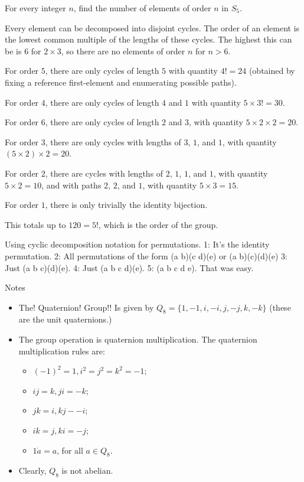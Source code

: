 \documentclass[1    0pt, answers]{exam} \renewcommand{\baselinestretch}{1.05}
\theoremstyle{plain}
\theoremstyle{definition}
\begin{document}
\begin{questions}
\question For every integer $n$, find the number of elements of order $n$ in $S_5$.

\begin{solution}
Every element can be decomposed into disjoint cycles.
The order of an element is the lowest common multiple of the lengths of these cycles.
The highest this can be is $6$ for $2 \times 3$, so there are no elements of order $n$ for $n > 6$.

For order $5$, there are only cycles of length $5$
with quantity $4! = 24$
(obtained by fixing a reference first-element and enumerating possible paths).

For order $4$, there are only cycles of length $4$ and $1$
with quantity $5 \times 3! = 30$.

For order $6$, there are only cycles of length $2$ and $3$,
with quantity $5 \times 2 \times 2 = 20$.

For order $3$, there are only cycles with lengths of $3$, $1$, and $1$,
with quantity $(5 \times 2) \times 2 = 20$.

For order $2$, there are cycles with lengths of $2$, $1$, $1$, and $1$,
with quantity $5 \times 2 = 10$,
and with paths $2$, $2$, and $1$,
with quantity $5 \times 3 = 15$.

For order $1$, there is only trivially the identity bijection.

This totals up to $120 = 5!$, which is the order of the group.
\end{solution}

\begin{solution}
Using cyclic decomposition notation for permutations.
1: It's the identity permutation.
2: All permutations of the form (a b)(c d)(e) or (a b)(c)(d)(e)
3: Just (a b c)(d)(e).
4: Just (a b c d)(e).
5: (a b c d e).
That was easy.
\end{solution}

Notes
\begin{itemize}
\item The! Quaternion! Group!! Is given by $Q_8 = \{ 1, -1, i, -i, j, -j, k, -k \}$ (these are the unit quaternions.)
\item The group operation is quaternion multiplication. The quaternion multiplication rules are:
\begin{itemize}
    \item $(-1)^2 = 1, i^2 = j^2 = k^2 = -1$;
    \item $ij = k, ji = -k$;
    \item $jk = i, kj - -i$;
    \item $ik =j, ki = -j$;
    \item $1 \dot a = a$, for all $a \in Q_8$.
\end{itemize}
\item Clearly, $Q_8$ is not abelian.
\end{itemize}


\end{questions}
\end{document}
